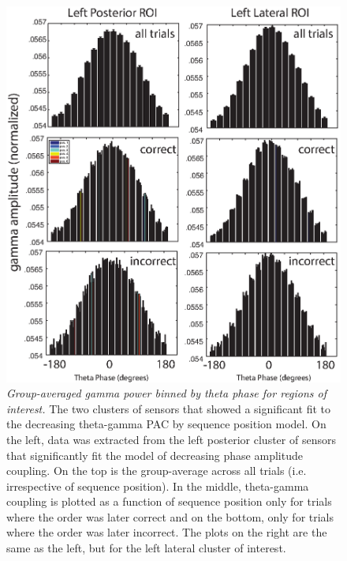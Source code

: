\begin{figure}
  \centering
  \includegraphics[width=.75\textwidth]{figures/chapter3_suppfigure6.eps}
  \caption[Group-averaged gamma power binned by theta phase for regions of interest]{\textit{Group-averaged gamma power binned by theta phase for regions of interest.} The two clusters of sensors that showed a significant fit to the decreasing theta-gamma PAC by sequence position model.  On the left, data was extracted from the left posterior cluster of sensors that significantly fit the model of decreasing phase amplitude coupling.  On the top is the group-average across all trials (i.e. irrespective of sequence position).  In the middle, theta-gamma coupling is plotted as a function of sequence position only for trials where the order was later correct and on the bottom, only for trials where the order was later incorrect.  The plots on the right are the same as the left, but for the left lateral cluster of interest.}
  \label{chapter3_suppfigure6}
\end{figure}

